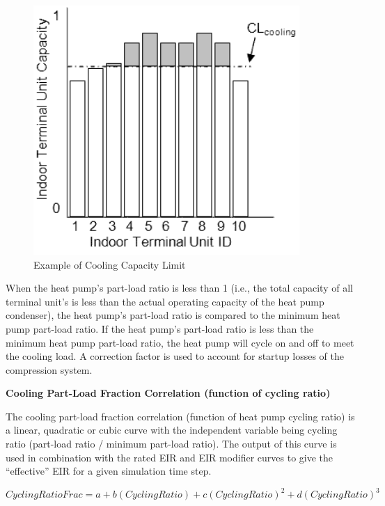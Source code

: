 \begin{figure}[hbtp] %
\centering
\includegraphics[width=0.9\textwidth, height=0.9\textheight, keepaspectratio=true]{media/image5376.png}
\caption{Example of Cooling Capacity Limit \label{fig:example-of-cooling-capacity-limit}}
\end{figure}

When the heat pump's part-load ratio is less than 1 (i.e., the total capacity of all terminal unit's is less than the actual operating capacity of the heat pump condenser), the heat pump's part-load ratio is compared to the minimum heat pump part-load ratio. If the heat pump's part-load ratio is less than the minimum heat pump part-load ratio, the heat pump will cycle on and off to meet the cooling load. A correction factor is used to account for startup losses of the compression system.

\textbf{Cooling Part-Load Fraction Correlation (function of cycling ratio)}

The cooling part-load fraction correlation (function of heat pump cycling ratio) is a linear, quadratic or cubic curve with the independent variable being cycling ratio (part-load ratio / minimum part-load ratio). The output of this curve is used in combination with the rated EIR and EIR modifier curves to give the ``effective'' EIR for a given simulation time step.

\begin{equation}
  CyclingRatioFrac = a + b \left( CyclingRatio \right) + c \left( CyclingRatio \right)^2 + d \left( CyclingRatio \right)^3
\end{equation}

